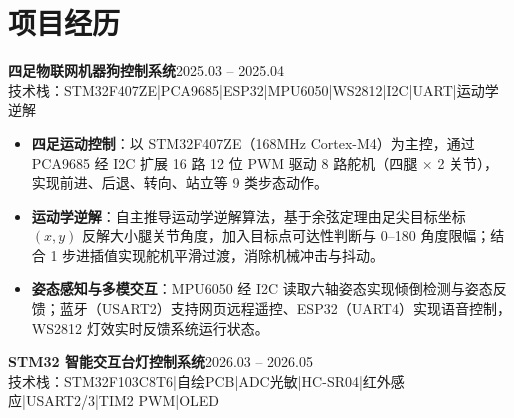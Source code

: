 \documentclass[10pt,a4paper]{article}
\newcommand{\projectblock}[3]{%
    {\bfseries\color{darktext}#1}\hfill{\color{graytext}#2}\\%
    {\small\color{graytext}#3}%
    \vspace{0.15em}%
}
\begin{document}
\vspace{0.2em}

\section{\faProjectDiagram\hspace{0.4em}项目经历}

\projectblock{四足物联网机器狗控制系统}{2025.03 -- 2025.04}{技术栈：STM32F407ZE\hspace{0.3em}|\hspace{0.3em}PCA9685\hspace{0.3em}|\hspace{0.3em}ESP32\hspace{0.3em}|\hspace{0.3em}MPU6050\hspace{0.3em}|\hspace{0.3em}WS2812\hspace{0.3em}|\hspace{0.3em}I2C\hspace{0.3em}|\hspace{0.3em}UART\hspace{0.3em}|\hspace{0.3em}运动学逆解}

\begin{itemize}[leftmargin=1.5em, itemsep=1pt, parsep=0pt, topsep=2pt]
    \item \textbf{四足运动控制}：以 STM32F407ZE（168MHz Cortex-M4）为主控，通过 PCA9685 经 I2C 扩展 16 路 12 位 PWM 驱动 8 路舵机（四腿 $\times$ 2 关节），实现前进、后退、转向、站立等 9 类步态动作。
    \item \textbf{运动学逆解}：自主推导运动学逆解算法，基于余弦定理由足尖目标坐标 $(x, y)$ 反解大小腿关节角度，加入目标点可达性判断与 0\textdegree--180\textdegree{} 角度限幅；结合 1\textdegree{} 步进插值实现舵机平滑过渡，消除机械冲击与抖动。
    \item \textbf{姿态感知与多模交互}：MPU6050 经 I2C 读取六轴姿态实现倾倒检测与姿态反馈；蓝牙（USART2）支持网页远程遥控、ESP32（UART4）实现语音控制，WS2812 灯效实时反馈系统运行状态。
\end{itemize}

\vspace{0.15em}

\projectblock{STM32 智能交互台灯控制系统}{2026.03 -- 2026.05}{技术栈：STM32F103C8T6\hspace{0.3em}|\hspace{0.3em}自绘PCB\hspace{0.3em}|\hspace{0.3em}ADC光敏\hspace{0.3em}|\hspace{0.3em}HC-SR04\hspace{0.3em}|\hspace{0.3em}红外感应\hspace{0.3em}|\hspace{0.3em}USART2/3\hspace{0.3em}|\hspace{0.3em}TIM2 PWM\hspace{0.3em}|\hspace{0.3em}OLED}
\end{document}
